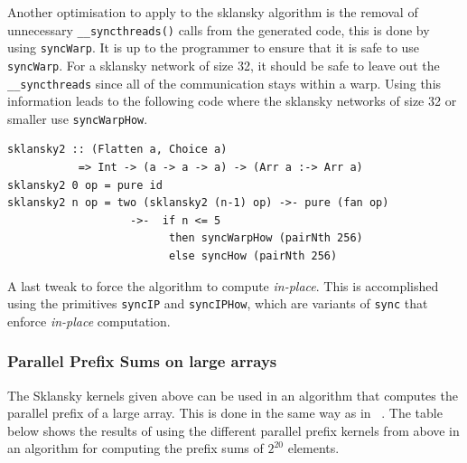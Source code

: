 Another optimisation to apply to the sklansky algorithm is the removal of 
unnecessary {\tt \_\_syncthreads()} calls from the generated code, this is 
done by using {\tt syncWarp}. It is up to the programmer to ensure that it 
is safe to use {\tt syncWarp}. For a sklansky network of size 32, it should 
be safe to leave out the {\tt \_\_syncthreads} since all of the communication 
stays within a warp. Using this information leads to the following code where 
the sklansky networks of size 32 or smaller use {\tt syncWarpHow}.


\begin{small}
\begin{verbatim} 
sklansky2 :: (Flatten a, Choice a) 
           => Int -> (a -> a -> a) -> (Arr a :-> Arr a) 
sklansky2 0 op = pure id
sklansky2 n op = two (sklansky2 (n-1) op) ->- pure (fan op) 
                   ->-  if n <= 5 
                         then syncWarpHow (pairNth 256)
                         else syncHow (pairNth 256)
\end{verbatim}
\end{small}


A last tweak to force the algorithm to compute {\em in-place}. This 
is accomplished using the primitives {\tt syncIP} and {\tt syncIPHow}, which
are variants of {\tt sync} that enforce {\em in-place} computation.

\subsubsection{Parallel Prefix Sums on large arrays}
\FloatBarrier

The Sklansky kernels given above can be used in an algorithm that computes 
the parallel prefix of a large array. This is done in the same way as in
~.
The table below shows the results of using the different parallel prefix 
kernels from above in an algorithm for computing the prefix sums of 
$2^{20}$ elements.

